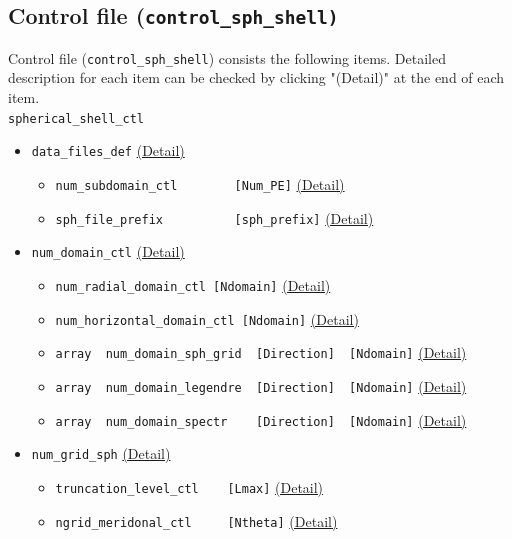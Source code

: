 \subsection{Control file (\tt{control\_sph\_shell})}
\label{section:control_sph_shell}
Control file ({\tt control\_sph\_shell}) consists the following items. Detailed description for each item can be checked by clicking "(Detail)" at the end of each item.
\\
%
\verb|spherical_shell_ctl|
\label{href_i:spherical_shell_ctl}
\\
%
\begin{itemize}
\item \verb|data_files_def|
	\label{href_i:data_files_def2}
	\hyperref[href_t:data_files_def]{(Detail)}
	\begin{itemize}
	\item \verb|num_subdomain_ctl        [Num_PE]|
		\hyperref[href_t:num_subdomain_ctl]{(Detail)}
	\item \verb|sph_file_prefix          [sph_prefix]|
    		\hyperref[href_t:sph_file_prefix]{(Detail)}
	\end{itemize}
%
\item \verb|num_domain_ctl|
	\label{href_i:num_domain_ctl}
	\hyperref[href_t:num_domain_ctl]{(Detail)}
	\begin{itemize}
    \item \verb|num_radial_domain_ctl [Ndomain]|
        \hyperref[href_t:num_radial_domain_ctl]{(Detail)}
    \item \verb|num_horizontal_domain_ctl [Ndomain]|
        \hyperref[href_t:num_horizontal_domain_ctl]{(Detail)}
	\item \verb|array  num_domain_sph_grid  [Direction]  [Ndomain]|
		\hyperref[href_t:num_domain_sph_grid]{(Detail)}
	\item \verb|array  num_domain_legendre  [Direction]  [Ndomain]|
	\hyperref[href_t:num_domain_legendre]{(Detail)}
	\item \verb|array  num_domain_spectr    [Direction]  [Ndomain]|
		\hyperref[href_t:num_domain_spectr]{(Detail)}
	\end{itemize}
%
\item \verb|num_grid_sph|
	\label{href_i:num_grid_sph}
	\hyperref[href_t:num_grid_sph]{(Detail)}
	\begin{itemize}
	\item \verb|truncation_level_ctl    [Lmax]|
		\hyperref[href_t:truncation_level_ctl]{(Detail)}
	\item \verb|ngrid_meridonal_ctl     [Ntheta]|
		\hyperref[href_t:ngrid_meridonal_ctl]{(Detail)}

\end{itemize}
\end{itemize}
